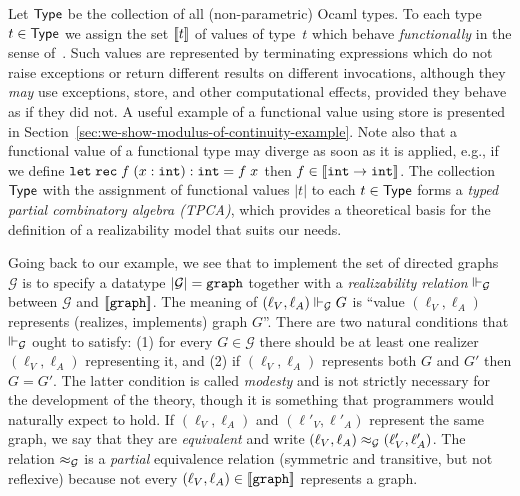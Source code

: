 Let $\mathsf{Type}$ be the collection of all (non-parametric) Ocaml types. To
each type $t \in \mathsf{Type}$ we assign the set $[\![t]\!]$ of values of
type~$t$ which behave \emph{functionally} in the sense
of~\cite{longley99when}. Such values are represented by terminating
expressions which do not raise exceptions or return different results
on different invocations, although they \emph{may} use exceptions,
store, and other computational effects, provided they behave as if
they did not. A useful example of a functional value using store is
presented in Section~\ref{sec:we-show-modulus-of-continuity-example}.
Note also that a functional value of a functional type may diverge as
soon as it is applied, e.g., if we define
$\mathtt{let}\;\mathtt{rec}\;f\;(x:\mathtt{int}):\mathtt{int} = f\;x$ then $f \in [\![\mathtt{int} \to
  \mathtt{int}]\!]$. The collection $\mathsf{Type}$ with the assignment of functional
values $|t|$ to each $t \in \mathsf{Type}$ forms a \emph{typed partial
  combinatory algebra (TPCA)}, which provides a theoretical basis for
the definition of a realizability model that suits our needs.

Going back to our example, we see that to implement the set of
directed graphs $\mathcal{G}$ is to specify a datatype
$|\mathcal{G}| = \mathtt{graph}$ together with a
\emph{realizability relation} $\Vdash_{\mathcal{G}}$ between
$\mathcal{G}$ and $[\![\mathtt{graph}]\!]$. The meaning of $(\ell_V,
\ell_A) \Vdash_\mathcal{G} G$ is ``value $(\ell_V, \ell_A)$ represents
(realizes, implements) graph $G$''. There are two natural conditions
that $\Vdash_\mathcal{G}$ ought to satisfy: (1) for every $G \in
\mathcal{G}$ there should be at least one realizer $(\ell_V, \ell_A)$
representing it, and (2) if $(\ell_V, \ell_A)$ represents both $G$ and
$G'$ then $G = G'$. The latter condition is called \emph{modesty} and
is not strictly necessary for the development of the theory, though it
is something that programmers would naturally expect to hold. If
$(\ell_V, \ell_A)$ and $(\ell'_V, \ell'_A)$ represent the same graph,
we say that they are \emph{equivalent} and write $(\ell_V, \ell_A)
\approx_\mathcal{G} (\ell'_V, \ell'_A)$. The relation $\approx_\mathcal{G}$
is a \emph{partial} equivalence relation (symmetric and transitive,
but not reflexive) because not every $(\ell_V, \ell_A) \in
[\![\mathtt{graph}]\!]$ represents a graph.

\bigskip

